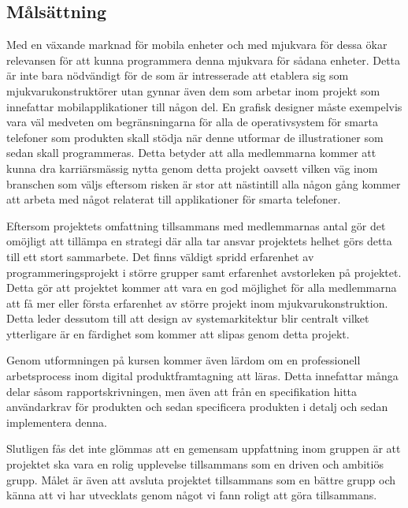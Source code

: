 \subsection{Målsättning}
Med en växande marknad för mobila enheter och med mjukvara för dessa ökar relevansen för att kunna programmera denna mjukvara för sådana enheter. Detta är inte bara nödvändigt för de som är intresserade att etablera sig som mjukvarukonstruktörer utan gynnar även dem som arbetar inom projekt som innefattar mobilapplikationer till någon del. En grafisk designer måste exempelvis vara väl medveten om begränsningarna för alla de operativsystem för smarta telefoner som produkten skall stödja när denne utformar de illustrationer som sedan skall programmeras. Detta betyder att alla medlemmarna kommer att kunna dra karriärsmässig nytta genom detta projekt oavsett vilken väg inom branschen som väljs eftersom risken är stor att nästintill alla någon gång kommer att arbeta med något relaterat till applikationer för smarta telefoner.

Eftersom projektets omfattning tillsammans med medlemmarnas antal gör det omöjligt att tillämpa en strategi där alla tar ansvar projektets helhet görs detta till ett stort sammarbete. Det finns väldigt spridd erfarenhet av programmeringsprojekt i större grupper samt erfarenhet avstorleken på projektet. Detta gör att projektet kommer att vara en god möjlighet för alla medlemmarna att få mer eller första erfarenhet av större projekt inom mjukvarukonstruktion. Detta leder dessutom till att design av systemarkitektur blir centralt vilket ytterligare är en färdighet som kommer att slipas genom detta projekt.

Genom utformningen på kursen kommer även lärdom om en professionell arbetsprocess inom digital produktframtagning att läras. Detta innefattar många delar såsom rapportskrivningen, men även att från en specifikation hitta användarkrav för produkten och sedan specificera produkten i detalj och sedan implementera denna.

Slutligen fås det inte glömmas att en gemensam uppfattning inom gruppen är att projektet ska vara en rolig upplevelse tillsammans som en driven och ambitiös grupp. Målet är även att avsluta projektet tillsammans som en bättre grupp och känna att vi har utvecklats genom något vi fann roligt att göra tillsammans. 
